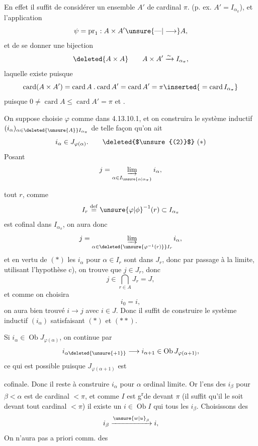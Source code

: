 En effet il suffit de considérer
un ensemble $A'$ de cardinal $\pi$. (p. ex. $A'=I_{\alpha_\pi}$), et
l'application
\[
\psi=\operatorname{pr}_1:A\times A'\unsure{\text{---}|\longrightarrow}A,
\]
et de se donner une bijection 
\[
\deleted{A\times A}\qquad A\times A'\xrightarrow{\sim}I_{\alpha_\pi},
\]
laquelle existe puisque
\[
\operatorname{card}(A\times A')=\operatorname{card}A\mathbin{.}\operatorname{card}A'=\operatorname{card}A'=\pi\inserted{{}=\operatorname{card}I_{\alpha_\pi}}
\]
puisque $0\neq\operatorname{card}A\leq\operatorname{card}A'=\pi$ et .

 On suppose choisie $\varphi$
comme dans 4.13.10.1, et on 
construira le système inductif
$(i_\alpha)_{\alpha\in\deleted{\unsure{A}}I_{\alpha_\pi}}$ de telle façon qu'on ait
\[
i_\alpha\in J_{\varphi(\alpha)}.\tag*{\deleted{$\unsure{(2)}$} $(*)$}
\]
Posant
\[
j=\varinjlim_{\alpha\in I_{\unsure{\alpha|\alpha_\pi}}}i_\alpha,
\]

 tout $r$, comme
\[
I_r\overset{\mathrm{def}}{=}\unsure{\varphi|\phi}^{-1}(r)\subset I_{\alpha_\pi}
\]
est cofinal dans $I_{\alpha_\pi}$, on aura donc
\[
j=\varinjlim_{\alpha\in\deleted{\unsure{\varphi^{-1}(r)}}I_r}i_\alpha,
\]
et  en vertu de $(*)$ les
$i_\alpha$ pour $\alpha\in I_r$ sont dans $J_r$, donc
par passage à la limite, utilisant
l'hypothèse c), on trouve que $j\in J_r$,
donc 
\[
j\in\bigcap_{r\in A}J_r=J,
\]
et comme on choisira
\[
i_0=i,\tag*{$(**)$}
\]
on aura bien trouvé $i\longrightarrow j$ avec $i\in J$.
Donc il suffit de construire le système
inductif $(i_\alpha)$ satisfaisant $(*)$ et $(**)$. 

Si  $i_\alpha\in\operatorname{Ob}J_{\varphi(\alpha)}$,  on continue
par
\[
i_{\alpha\deleted{\unsure{+1}}}\longrightarrow i_{\alpha+1}\in\operatorname{Ob}J_{\varphi(\alpha+1)},
\]
ce qui est possible puisque $J_{\varphi(\alpha+1)}$ est

cofinale. Donc il reste à  construire
$i_\alpha$ pour $\alpha$ ordinal limite. Or
l'ens des $i_\beta$ pour $\beta<\alpha$ est de
cardinal $<\pi$, et comme  $I$ est g\textsuperscript{r}de
devant $\pi$ (il suffit qu'il le soit devant
tout cardinal $<\pi$) il existe un
$i\in\operatorname{Ob}I$ qui  tous les $i_\beta$.
Choisissons des
\[
i_\beta\xrightarrow{\unsure{w|u}_\beta}i,
\]
On n'aura pas a priori comm. des

